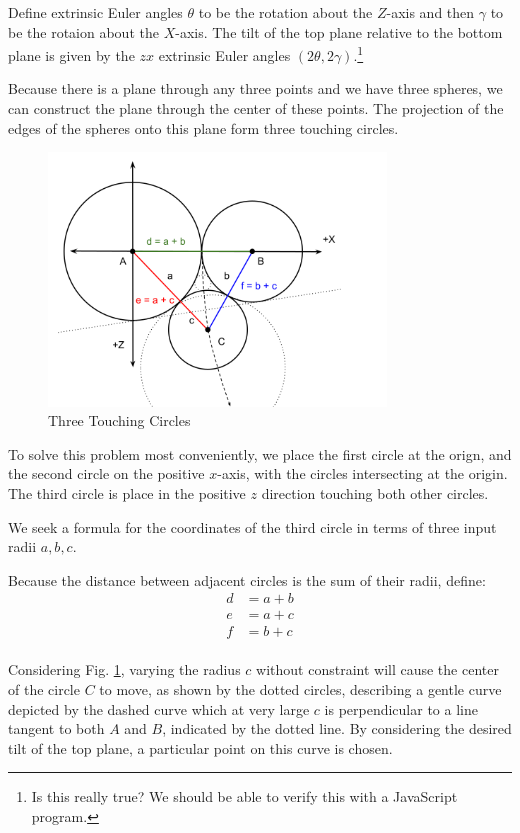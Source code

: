 \documentclass{article}
\begin{document}
Define extrinsic Euler angles $\theta$ to be the rotation about the $Z$-axis and then $\gamma$ to
be the rotaion about the $X$-axis.
The tilt of the top plane relative
to the bottom plane is given by the $zx$ extrinsic Euler angles $(2\theta, 2\gamma)$.\footnote{Is this really true?
We should be able to verify this with a JavaScript program.}

Because there is a plane through any three points and we have three spheres, we can construct the plane through
the center of these points.
The projection of the edges of the spheres onto this plane form three touching circles.

\begin{figure}
     \centering
     \includegraphics[width=0.8\textwidth]{figures/ThreeTouchingPlanarCircles.png}
     \caption{Three Touching Circles}
  \label{fig:Tangent}
\end{figure}

To solve this problem most conveniently, we place the first circle at the orign, and the second circle
on the positive $x$-axis, with the circles intersecting at the origin.
The third circle is place in the positive $z$ direction touching both other circles.

We seek a formula for the coordinates of the third circle in terms of three input radii $a,b,c$.

Because the distance between adjacent circles is the sum of their radii, define:
\begin{align}
  d  &= a + b \\
  e  &= a + c \\
  f  &= b + c \\
\end{align}

Considering Fig. \ref{fig:Tangent}, varying the radius $c$ without constraint will cause
the center of the circle $C$ to move, as shown by the dotted circles,
describing a gentle curve depicted by the dashed curve which at very large $c$ is perpendicular to a
line tangent to both $A$ and $B$, indicated by the dotted line.
By considering the desired tilt of the top plane,
a particular point on this curve is chosen.
\end{document}
